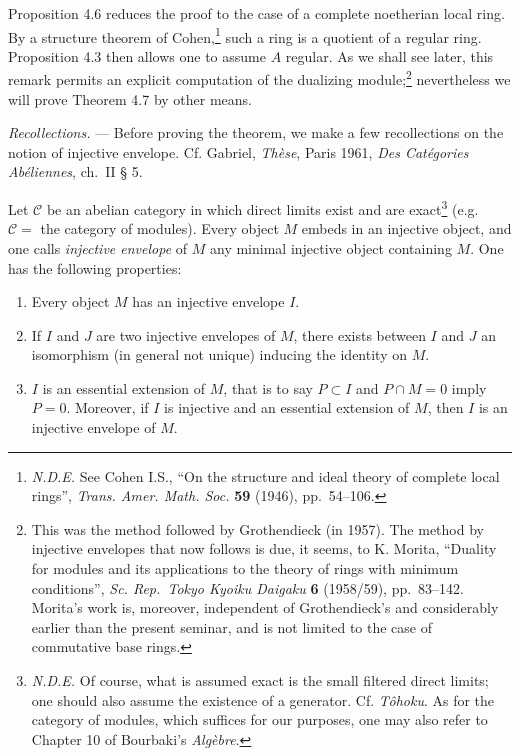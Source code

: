 \documentclass[
]{article}
\begin{document}
Proposition 4.6 reduces the proof to the case of a complete noetherian
local ring. By a structure theorem of Cohen,\footnote{\emph{N.D.E.} See
  Cohen I.S., ``On the structure and ideal theory of complete local
  rings'', \emph{Trans. Amer. Math. Soc.} \textbf{59} (1946),
  pp.~54--106.} such a ring is a quotient of a regular ring. Proposition
4.3 then allows one to assume \(A\) regular. As we shall see later, this
remark permits an explicit computation of the dualizing
module;\footnote{This was the method followed by Grothendieck (in 1957).
  The method by injective envelopes that now follows is due, it seems,
  to K. Morita, ``Duality for modules and its applications to the theory
  of rings with minimum conditions'', \emph{Sc. Rep.~Tokyo Kyoiku
  Daigaku} \textbf{6} (1958/59), pp.~83--142. Morita's work is,
  moreover, independent of Grothendieck's and considerably earlier than
  the present seminar, and is not limited to the case of commutative
  base rings.} nevertheless we will prove Theorem 4.7 by other means.

\emph{Recollections.} --- Before proving the theorem, we make a few
recollections on the notion of injective envelope. Cf. Gabriel,
\emph{Thèse}, Paris 1961, \emph{Des Catégories Abéliennes}, ch.~II § 5.

Let \(\mathcal{C}\) be an abelian category in which direct limits exist
and are exact\footnote{\emph{N.D.E.} Of course, what is assumed exact is
  the small filtered direct limits; one should also assume the existence
  of a generator. Cf. \emph{Tôhoku}. As for the category of modules,
  which suffices for our purposes, one may also refer to Chapter 10 of
  Bourbaki's \emph{Algèbre}.} (e.g.~\(\mathcal{C} =\) the category of
modules). Every object \(M\) embeds in an injective object, and one
calls \emph{injective envelope} of \(M\) any minimal injective object
containing \(M\). One has the following properties:

\begin{enumerate}
\def\labelenumi{(\roman{enumi})}
\item
  Every object \(M\) has an injective envelope \(I\).
\item
  If \(I\) and \(J\) are two injective envelopes of \(M\), there exists
  between \(I\) and \(J\) an isomorphism (in general not unique)
  inducing the identity on \(M\).
\item
  \(I\) is an essential extension of \(M\), that is to say
  \(P \subset I\) and \(P \cap M = {0}\) imply \(P = {0}\). Moreover, if
  \(I\) is injective and an essential extension of \(M\), then \(I\) is
  an injective envelope of \(M\).
\end{enumerate}
\end{document}
